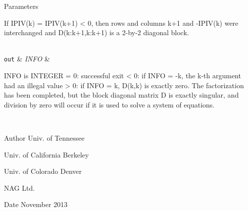 \begin{DoxyParams}[1]{Parameters}
\begin{DoxyVerb}
             If IPIV(k) = IPIV(k+1) < 0, then rows and columns
             k+1 and -IPIV(k) were interchanged and D(k:k+1,k:k+1)
             is a 2-by-2 diagonal block.\end{DoxyVerb}
\\
\hline
\mbox{\tt out}  & {\em I\+N\+F\+O} & \begin{DoxyVerb}          INFO is INTEGER
          = 0: successful exit
          < 0: if INFO = -k, the k-th argument had an illegal value
          > 0: if INFO = k, D(k,k) is exactly zero.  The factorization
               has been completed, but the block diagonal matrix D is
               exactly singular, and division by zero will occur if it
               is used to solve a system of equations.\end{DoxyVerb}
 \\
\hline
\end{DoxyParams}
\begin{DoxyAuthor}{Author}
Univ. of Tennessee 

Univ. of California Berkeley 

Univ. of Colorado Denver 

N\+A\+G Ltd. 
\end{DoxyAuthor}
\begin{DoxyDate}{Date}
November 2013 
\end{DoxyDate}
